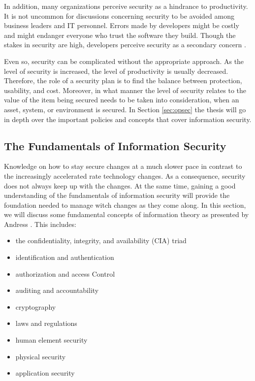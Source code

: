 In addition, many organizations perceive security as a hindrance to productivity. It is not uncommon for discussions concerning security to be avoided  among business leaders and IT personnel. Errors made by developers might be costly and might endanger everyone who trust the software they build. Though the stakes in security are high, developers perceive security as a secondary concern \cite{Lopez_2019}. 

Even so, security can be complicated without the appropriate approach. As the level of security is increased, the level of productivity is usually decreased. Therefore, the role of a security plan is to find the balance between protection, usability, and cost. Moreover, in what manner the level of security relates to the value of the item being secured needs to be taken into consideration, when an asset, system, or environment is secured. In Section \ref{sec:opsec} the thesis will go in depth over the important policies and concepts that cover information security.

\subsection{The Fundamentals of Information Security}
Knowledge on how to stay secure changes at a much slower pace in contrast to the increasingly accelerated rate technology changes. As a consequence, security does not always keep up with the changes. At the same time, gaining a good understanding of the fundamentals of information security will provide the foundation needed to manage witch changes as they come along. In this section, we will discuss some fundamental concepts of information theory as presented by Andress \cite{andress2014the}. This includes:
\begin{itemize}
    \item the confidentiality, integrity, and availability (CIA) triad
    \item identification and authentication
    \item authorization and access Control
    \item auditing and accountability
    \item cryptography
    \item laws and regulations
    \item human element security
    \item physical security
    \item application security
\end{itemize}

